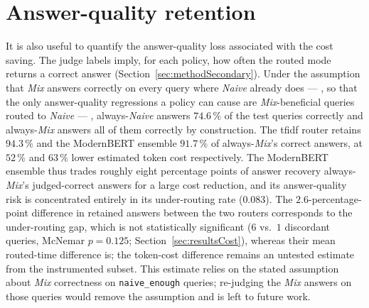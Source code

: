 \documentclass[english, bibtex]{kththesis}               %
\numberwithin{listing}{chapter}
\providecommand{\DIFaddtex}[1]{{\protect\color{blue} \sf #1}} %
\providecommand{\DIFdeltex}[1]{{\protect\color{red} \scriptsize #1}} %
\providecommand{\DIFaddbegin}{} %
\providecommand{\DIFaddend}{} %
\providecommand{\DIFdelbegin}{} %
\providecommand{\DIFdelend}{} %
\providecommand{\DIFadd}[1]{\texorpdfstring{\DIFaddtex{#1}}{#1}} %
\providecommand{\DIFdel}[1]{\texorpdfstring{\DIFdeltex{#1}}{}} %
\begin{document}
\section{Answer-quality retention}
\label{sec:resultsRetention}

\DIFadd{It is also useful to quantify the answer-quality loss associated with the cost saving}\DIFaddend . The judge labels imply, for each policy, how often the routed mode returns a correct answer \DIFaddbegin \DIFadd{(Section~\ref{sec:methodSecondary})}\DIFaddend . Under the assumption that \emph{Mix} answers correctly on every query where \emph{Naive} already does\DIFdelbegin \DIFdel{--- }\DIFdelend \DIFaddbegin \DIFadd{, }\DIFaddend so that the only answer-quality regressions a policy can cause are \emph{Mix}-beneficial queries routed to \emph{Naive}\DIFdelbegin \DIFdel{--- }\DIFdelend \DIFaddbegin \DIFadd{, }\DIFaddend always-\emph{Naive} answers $74.6\,\%$ of the test queries correctly and always-\emph{Mix} answers all of them correctly by construction. The \gls{tfidf} router retains $94.3\,\%$ and the ModernBERT ensemble $91.7\,\%$ of always-\emph{Mix}'s correct answers, at $52\,\%$ and $63\,\%$ lower estimated token cost respectively. The ModernBERT ensemble thus trades roughly eight percentage points of \DIFdelbegin \DIFdel{answer recovery }\DIFdelend \DIFaddbegin \DIFadd{always-\emph{Mix}'s judged-correct answers }\DIFaddend for a large cost reduction, and its answer-quality risk is concentrated entirely in its under-routing rate ($0.083$). \DIFaddbegin \DIFadd{The $2.6$-percentage-point difference in retained answers between the two routers corresponds to the under-routing gap, which is not statistically significant ($6$ vs.\ $1$ discordant queries, McNemar $p = 0.125$; Section~\ref{sec:resultsCost}), whereas their mean routed-time difference is; the token-cost difference remains an untested estimate from the instrumented subset. }\DIFaddend This estimate relies on the stated assumption about \emph{Mix} correctness on \texttt{naive\_enough} queries; re-judging the \emph{Mix} answers on those queries would remove the assumption and is left to future work.

\DIFdelbegin %
\end{document}
